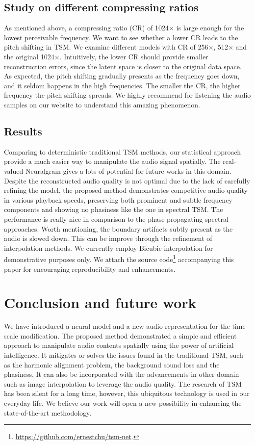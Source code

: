 \documentclass[12pt]{article}
\begin{document}
\subsection{Study on different compressing ratios}
As mentioned above, a compressing ratio (CR) of 1024$\times$ is large enough for the lowest perceivable frequency. We want to see whether a lower CR leads to the pitch shifting in TSM. We examine different models with CR of 256$\times$, 512$\times$ and the original 1024$\times$. Intuitively, the lower CR should provide smaller reconstruction errors, since the latent space is closer to the original data space. As expected, the pitch shifting gradually presents as the frequency goes down, and it seldom happens in the high frequencies. The smaller the CR, the higher frequency the pitch shifting spreads. We highly recommend for listening the audio samples on our website to understand this amazing phenomenon.

\subsection{Results}
Comparing to deterministic traditional TSM methods, our statistical approach provide a much easier way to manipulate the audio signal spatially. The real-valued Neuralgram gives a lots of potential for future works in this domain. Despite the reconstructed audio quality is not optimal due to the lack of carefully refining the model, the proposed method demonstrates competitive audio quality in various playback speeds, preserving both prominent and subtle frequency components and showing no phasiness like the one in spectral TSM. The performance is really nice in comparison to the phase propagating spectral approaches. Worth mentioning, the boundary artifacts subtly present as the audio is slowed down. This can be improve through the refinement of interpolation methods. We currently employ Bicubic \cite{key81} interpolation for demonstrative purposes only. We attach the source code\footnote{\url{https://github.com/ernestchu/tsm-net}.} accompanying this paper for encouraging reproducibility and enhancements.

\section{Conclusion and future work}
We have introduced a neural model and a new audio representation for the time-scale modification. The proposed method demonstrated a simple and efficient approach to manipulate audio contents spatially using the power of artificial intelligence. It mitigates or solves the issues found in the traditional TSM, such as the harmonic alignment problem, the background sound loss and the phasiness. It can also be incorporated with the advancements in other domain such as image interpolation to leverage the audio quality. The research of TSM has been silent for a long time, however, this ubiquitous technology is used in our everyday life. We believe our work will open a new possibility in enhancing the state-of-the-art methodology.
\end{document}
